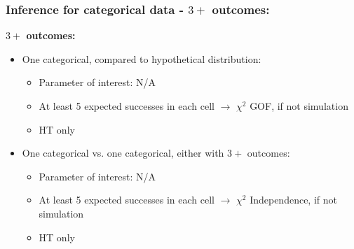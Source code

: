 \documentclass[11pt,containsverbatim,handout,xcolor=xelatex,dvipsnames,table]{beamer}
\begin{document}
\begin{frame}
\frametitle{Inference for categorical data - $3+$ outcomes:}

\textbf{$3+$ outcomes:}

\pause

\begin{itemize}

\item One categorical, compared to hypothetical distribution: \\
\begin{itemize}
\item Parameter of interest: N/A
\item At least 5 expected  successes in each cell $\rightarrow$ $\chi^2$ GOF, if not simulation
\item HT only
\end{itemize}

\pause

\item One categorical vs. one categorical, either with $3+$ outcomes: \\
\begin{itemize}
\item Parameter of interest: N/A
\item At least 5 expected successes in each cell $\rightarrow$ $\chi^2$ Independence, if not simulation
\item HT only
\end{itemize}

\end{itemize}

\end{frame}

\end{document}
